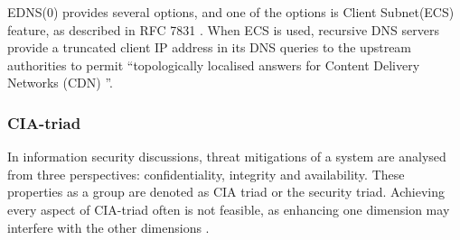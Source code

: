 EDNS(0) provides several options, and one of the options is Client Subnet(ECS) feature, as described in RFC 7831 \cite{rfc7871}. When ECS is used, recursive DNS servers provide a truncated client IP address in its DNS queries to the upstream authorities to permit ``topologically localised answers for Content Delivery Networks (CDN) \cite{kintis2016understanding}''.

\subsubsection{CIA-triad}
In information security discussions, threat mitigations of a system are analysed from three perspectives: confidentiality, integrity and availability. These properties as a group are denoted as CIA triad or the security triad.
Achieving every aspect of CIA-triad often is not feasible, as enhancing one dimension may interfere with the other dimensions \cite{securityincomputing}.
